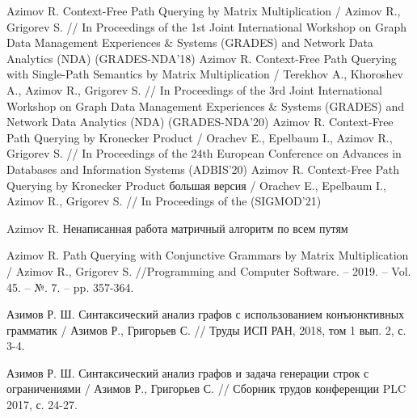 \begin{thebibliography}{99}
	 Azimov R. Context-Free Path Querying by
	Matrix Multiplication / Azimov R., Grigorev S. // In Proceedings of the
	1st Joint International Workshop on Graph Data Management Experiences \&
	Systems (GRADES) and Network Data Analytics (NDA) (GRADES-NDA’18)
	 Azimov R. Context-Free Path Querying with Single-Path Semantics by
	Matrix Multiplication / Terekhov A., Khoroshev A., Azimov R., Grigorev S. // In Proceedings of the
	3rd Joint International Workshop on Graph Data Management Experiences \&
	Systems (GRADES) and Network Data Analytics (NDA) (GRADES-NDA’20)
	 Azimov R. Context-Free Path Querying by Kronecker
	Product / Orachev E., Epelbaum I., Azimov R., Grigorev S. // In Proceedings of the
	24th European Conference on Advances in Databases and Information Systems (ADBIS’20)
	 Azimov R. Context-Free Path Querying by Kronecker
	Product большая версия / Orachev E., Epelbaum I., Azimov R., Grigorev S. // In Proceedings of the (SIGMOD’21)
	
	 Azimov R. Ненаписанная работа матричный алгоритм по всем путям
	
	 Azimov R. Path Querying with Conjunctive Grammars by Matrix Multiplication / Azimov R., Grigorev S. //Programming and Computer Software. – 2019. – Vol. 45. – №. 7. – pp. 357-364.
	\setcounter{firstbib}{\value{enumiv}}
	
	
	
	 Азимов Р. Ш. Синтаксический анализ графов с использованием конъюнктивных грамматик / Азимов Р., Григорьев С. // Труды ИСП РАН, 2018, том 1 вып. 2, с. 3-4.
	
	 Азимов Р. Ш. Синтаксический анализ графов и задача генерации строк с ограничениями / Азимов Р., Григорьев С. // Сборник трудов конференции PLC 2017, с. 24-27.
\end{thebibliography}